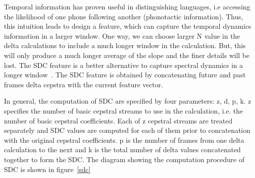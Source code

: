 \begin{spacing}{1.5}
Temporal information has proven useful in distinguishing languages, i.e accessing the likelihood of one phone following another (phonotactic information). Thus, this intuition leads to design a feature, which can capture the temporal dynamics information in a larger window. One way, we can choose larger N value in the delta calculations to include a much longer window in the calculation. But, this will only produce a much longer average of the slope and the finer details will be lost. The SDC feature is a better alternative to capture spectral dynamics in a longer window~\cite{torres2002approaches}. The SDC feature is obtained by concatenating future and past frames delta cepstra with the current feature vector.

In general, the computation of SDC are specified by four parameters: z, d, p, k. z specifies the number of basic cepstral streams to use in the calculation, i.e. the number of basic cepstral coefficients. Each of z cepstral streams are treated separately and SDC values are computed for each of them prior to concatenation with the original cepstral coefficients. p is the number of frames from one delta calculation to the next and k is the total number of delta values concatenated together to form the SDC. The diagram showing the computation procedure of SDC is shown in figure~\ref{sdc}


\end{spacing}
